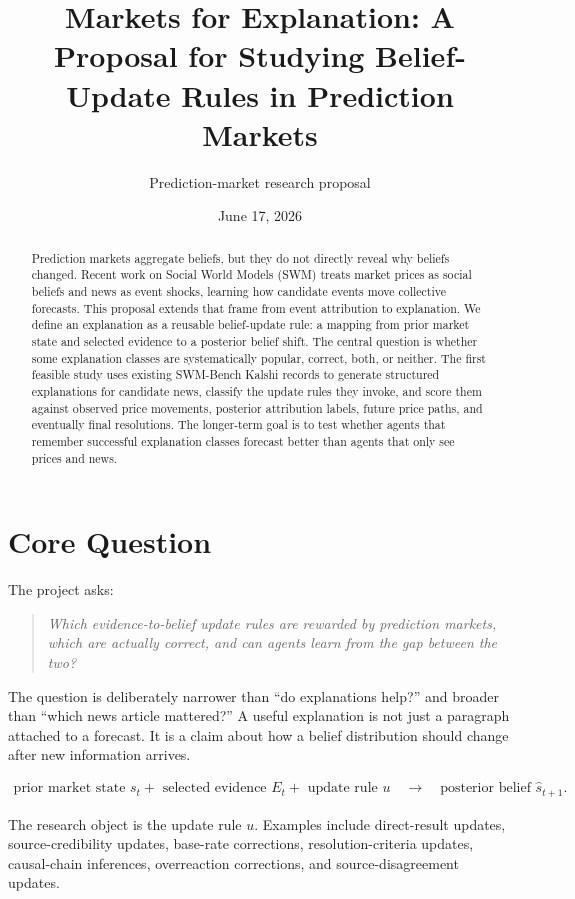 \documentclass[11pt]{article}
\title{Markets for Explanation: A Proposal for Studying Belief-Update Rules in Prediction Markets}
\author{Prediction-market research proposal}
\date{June 17, 2026}
\begin{document}
\maketitle

\begin{abstract}
Prediction markets aggregate beliefs, but they do not directly reveal why beliefs changed. Recent work on Social World Models (SWM) treats market prices as social beliefs and news as event shocks, learning how candidate events move collective forecasts. This proposal extends that frame from event attribution to explanation. We define an explanation as a reusable belief-update rule: a mapping from prior market state and selected evidence to a posterior belief shift. The central question is whether some explanation classes are systematically popular, correct, both, or neither. The first feasible study uses existing SWM-Bench Kalshi records to generate structured explanations for candidate news, classify the update rules they invoke, and score them against observed price movements, posterior attribution labels, future price paths, and eventually final resolutions. The longer-term goal is to test whether agents that remember successful explanation classes forecast better than agents that only see prices and news.
\end{abstract}

\section{Core Question}
The project asks:

\begin{quote}
\textit{Which evidence-to-belief update rules are rewarded by prediction markets, which are actually correct, and can agents learn from the gap between the two?}
\end{quote}

The question is deliberately narrower than ``do explanations help?'' and broader than ``which news article mattered?'' A useful explanation is not just a paragraph attached to a forecast. It is a claim about how a belief distribution should change after new information arrives.

\begin{align}
\text{prior market state } s_t + \text{ selected evidence } E_t + \text{ update rule } u
\quad \longrightarrow \quad
\text{posterior belief } \hat{s}_{t+1}.
\end{align}

The research object is the update rule $u$. Examples include direct-result updates, source-credibility updates, base-rate corrections, resolution-criteria updates, causal-chain inferences, overreaction corrections, and source-disagreement updates.
\end{document}
